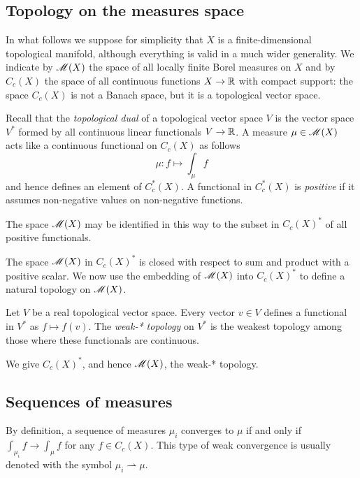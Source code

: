\subsection{Topology on the measures space} \label{topology:measure:subsection}
In what follows we suppose for simplicity that $X$ is a finite-dimensional topological manifold, although everything is valid in a much wider generality. We indicate by $\mathscr{M}(X)$ the space of all locally finite Borel measures on $X$ and by $C_c(X)$ the space of all continuous functions $X\to \mathbb{R}$ with compact support: the space $C_c(X)$ is not a Banach space, but it is a topological vector space.

Recall that the \emph{topological dual} of a topological vector space $V$ is the vector space $V^*$ formed by all continuous linear functionals $V\to \mathbb{R}$.
A measure $\mu\in\mathscr{M}(X)$ acts like a continuous functional on $C_c(X)$ as follows
$$\mu\colon f \longmapsto \int_\mu f$$
and hence defines an element of $C_c^*(X)$. A functional in $C_c^*(X)$ is \emph{positive} if it assumes non-negative values on non-negative functions. 

\begin{teo} The space $\mathscr{M}(X)$ may be identified in this way to the subset in $C_c(X)^*$ of all positive functionals. 
\end{teo}

The space $\mathscr{M}(X)$ in $C_c(X)^*$ is closed with respect to sum and product with a positive scalar.
We now use the embedding of $\mathscr{M}(X)$ into $C_c(X)^*$ to define a natural topology on $\mathscr{M}(X)$.

\begin{defn}
Let $V$ be a real topological vector space. Every vector $v\in V$ defines a functional in $V^*$ as $f\mapsto f(v)$. The \emph{weak-* topology} on $V^*$ is the weakest topology among those where these functionals are continuous.
\end{defn}

We give $C_c(X)^*$, and hence $\mathscr{M}(X)$, the weak-* topology. 

\subsection{Sequences of measures} \label{mu:sequence:subsection}
By definition, a sequence of measures  $\mu_i$ converges to $\mu$ if and only if $\int_{\mu_i} f \to \int_\mu f$ for any $f\in C_c(X)$. This type of weak convergence is usually denoted with the symbol
$\mu_i \rightharpoonup \mu$.
 
